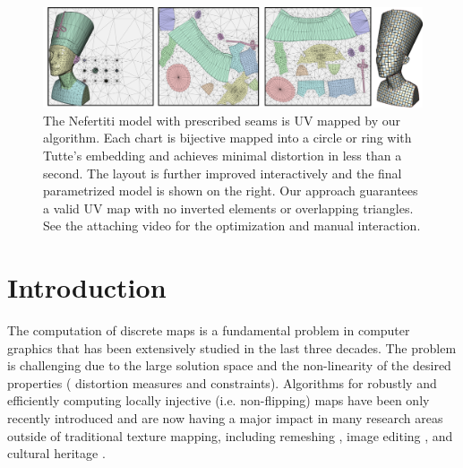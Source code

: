 \begin{figure}
  \center
 \includegraphics[width=\textwidth]{scaf-tex/figs/teaser}
 \caption{The Nefertiti model with prescribed seams is UV mapped by our algorithm. Each chart is bijective mapped into a circle or ring with Tutte's embedding and achieves minimal distortion in less than a second. The layout is further improved interactively and the final parametrized model is shown on the right. Our approach guarantees a valid UV map with no inverted elements or overlapping triangles. See the attaching video for the optimization and manual interaction.
}
 \label{scaf:fig:teaser}
\end{figure}

\section{Introduction}

The computation of discrete maps is a fundamental problem in computer graphics that has been extensively studied in the last three decades. The problem is challenging due to the large solution space
and the non-linearity of the desired properties ( distortion measures and constraints). Algorithms for robustly and efficiently computing locally injective (i.e. non-flipping) maps have been only recently introduced \cite{Lipman:2012,Kovalsky:2016,Rabinovich:2017} and are now having a major impact in many research areas outside of traditional texture mapping, including remeshing \cite{Bommes:2013}, image editing \cite{Poranne:2014}, and cultural heritage \cite{Pal:2014}.

